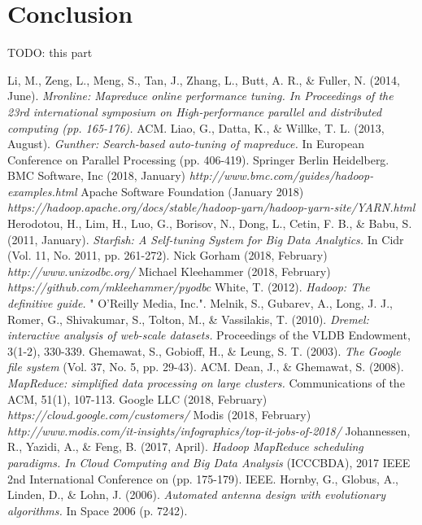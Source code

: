 \documentclass[a4paper,english]{report}
\begin{document}
	\chapter{Conclusion}
	TODO: this part
	
	\begin{thebibliography}{1}
		Li, M., Zeng, L., Meng, S., Tan, J., Zhang, L., Butt, A. R., \& Fuller, N. (2014, June). \emph{Mronline: Mapreduce online performance tuning. In Proceedings of the 23rd international symposium on High-performance parallel and distributed computing (pp. 165-176).} ACM.
		Liao, G., Datta, K., \& Willke, T. L. (2013, August). \emph{Gunther: Search-based auto-tuning of mapreduce.} In European Conference on Parallel Processing (pp. 406-419). Springer Berlin Heidelberg.
		BMC Software, Inc (2018, January) \emph{http://www.bmc.com/guides/hadoop-examples.html}
		Apache Software Foundation (January 2018) \emph{https://hadoop.apache.org/docs/stable/hadoop-yarn/hadoop-yarn-site/YARN.html}
		Herodotou, H., Lim, H., Luo, G., Borisov, N., Dong, L., Cetin, F. B., \& Babu, S. (2011, January). \emph{Starfish: A Self-tuning System for Big Data Analytics.} In Cidr (Vol. 11, No. 2011, pp. 261-272).
		Nick Gorham (2018, February) \emph{http://www.unixodbc.org/}
		Michael Kleehammer (2018, February) \emph{https://github.com/mkleehammer/pyodbc}
		White, T. (2012). \emph{Hadoop: The definitive guide.} " O'Reilly Media, Inc.".
		Melnik, S., Gubarev, A., Long, J. J., Romer, G., Shivakumar, S., Tolton, M., \& Vassilakis, T. (2010). \emph{Dremel: interactive analysis of web-scale datasets.} Proceedings of the VLDB Endowment, 3(1-2), 330-339.
		Ghemawat, S., Gobioff, H., \& Leung, S. T. (2003). \emph{The Google file system} (Vol. 37, No. 5, pp. 29-43). ACM.
		Dean, J., \& Ghemawat, S. (2008). \emph{MapReduce: simplified data processing on large clusters.} Communications of the ACM, 51(1), 107-113.
		Google LLC (2018, February) \emph{https://cloud.google.com/customers/}
		Modis (2018, February) \emph{http://www.modis.com/it-insights/infographics/top-it-jobs-of-2018/}
		Johannessen, R., Yazidi, A., \& Feng, B. (2017, April). \emph{Hadoop MapReduce scheduling paradigms. In Cloud Computing and Big Data Analysis} (ICCCBDA), 2017 IEEE 2nd International Conference on (pp. 175-179). IEEE.
		Hornby, G., Globus, A., Linden, D., \& Lohn, J. (2006). \emph{Automated antenna design with evolutionary algorithms.} In Space 2006 (p. 7242).

\end{thebibliography}
\end{document}
